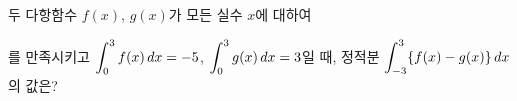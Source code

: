 두 다항함수 $f(x)$, $g(x)$가 모든 실수 $x$에 대하여\par\smallskip{}\par\smallskip\noindent 를 만족시키고 $\displaystyle\int_{0}^{3} f(x)\mkern3mu dx=-5$, $\displaystyle\int_{0}^{3} g(x)\mkern3mu dx=3$일 때, 정적분 $\displaystyle\int_{-3}^{3}\{f(x)-g(x)\}\mkern3mu dx$의 값은?
